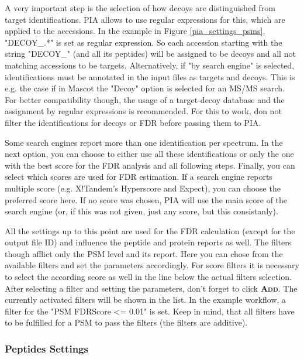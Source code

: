\documentclass[a4paper,11pt,twoside]{article}
\newcommand{\menu}[1]{{\scshape\bfseries #1}}
\begin{document}
A very important step is the selection of how decoys are distinguished from
target identifications. PIA allows to use regular expressions for this, which
are applied to the accessions. In the example in Figure
\ref{pia_settings_psms}, "DECOY\_.*" is set as regular expression. So each
accession starting with the string "DECOY\_" (and all its peptides) will be
assigned to be decoys and all not matching accessions to be targets.
Alternatively, if "by search engine" is selected, identifications must be
annotated in the input files as targets and decoys. This is e.g. the case if in
Mascot the "Decoy" option is selected for an MS/MS search. For better
compatibility though, the usage of a target-decoy database and the assignment
by regular expressions is recommended. For this to work, don not filter the
identifications for decoys or FDR before passing them to PIA.

Some search engines report more than one identification per spectrum. In the
next option, you can choose to either use all these identifications or only the
one with the best score for the FDR analysis and all following steps. Finally,
you can select which scores are used for FDR estimation. If a search engine
reports multiple score (e.g. X!Tandem's Hyperscore and Expect), you can choose
the preferred score here. If no score was chosen, PIA will use the main score of
the search engine (or, if this was not given, just any score, but this
consistanly).

All the settings up to this point are used for the FDR calculation (except for
the output file ID) and influence the peptide and protein reports as well. The
filters though afflict only the PSM level and its report. Here you can chose
from the available filters and set the parameters accordingly. For score filters
it is necessary to select the according score as well in the line below the
actual filters selection. After selecting a filter and setting the parameters,
don't forget to click \menu{Add}. The currently activated filters will be shown
in the list. In the example workflow, a filter for the "PSM FDRScore <= 0.01" is
set. Keep in mind, that all filters have to be fulfilled for a PSM to pass the
filters (the filters are additive).


\subsubsection{Peptides Settings}
\end{document}

